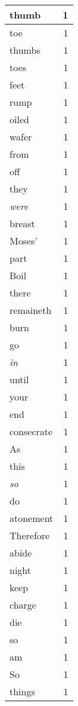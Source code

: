 \begin{center}
\begin{longtable}{l|r}
thumb & 1 \\ \hline
toe & 1 \\ \hline
thumbs & 1 \\ \hline
toes & 1 \\ \hline
feet & 1 \\ \hline
rump & 1 \\ \hline
oiled & 1 \\ \hline
wafer & 1 \\ \hline
from & 1 \\ \hline
off & 1 \\ \hline
they & 1 \\ \hline
\emph{were} & 1 \\ \hline
breast & 1 \\ \hline
Moses' & 1 \\ \hline
part & 1 \\ \hline
Boil & 1 \\ \hline
there & 1 \\ \hline
remaineth & 1 \\ \hline
burn & 1 \\ \hline
go & 1 \\ \hline
\emph{in} & 1 \\ \hline
until & 1 \\ \hline
your & 1 \\ \hline
end & 1 \\ \hline
consecrate & 1 \\ \hline
As & 1 \\ \hline
this & 1 \\ \hline
\emph{so} & 1 \\ \hline
do & 1 \\ \hline
atonement & 1 \\ \hline
Therefore & 1 \\ \hline
abide & 1 \\ \hline
night & 1 \\ \hline
keep & 1 \\ \hline
charge & 1 \\ \hline
die & 1 \\ \hline
so & 1 \\ \hline
am & 1 \\ \hline
So & 1 \\ \hline
things & 1 \\ \hline
\end{longtable}
\end{center}



\normalsize



